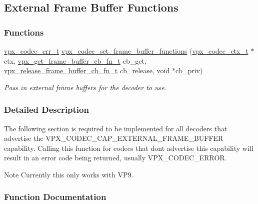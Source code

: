 \hypertarget{group__cap__external__frame__buffer}{}\subsection{External Frame Buffer Functions}
\label{group__cap__external__frame__buffer}
\subsubsection*{Functions}
\begin{DoxyCompactItemize}
\item 
\hyperlink{group__codec_gada1084710837ad363b92f2379dd2b8d2}{vpx\+\_\+codec\+\_\+err\+\_\+t} \hyperlink{group__cap__external__frame__buffer_gad209e7c3f6a330d11846be70a880182c}{vpx\+\_\+codec\+\_\+set\+\_\+frame\+\_\+buffer\+\_\+functions} (\hyperlink{group__codec_gad03e2dfa6ae511db7d25be6bbb336233}{vpx\+\_\+codec\+\_\+ctx\+\_\+t} $\ast$ctx, \hyperlink{vpx__frame__buffer_8h_a178a7aeb9acedc2d9e5227cea1301169}{vpx\+\_\+get\+\_\+frame\+\_\+buffer\+\_\+cb\+\_\+fn\+\_\+t} cb\+\_\+get, \hyperlink{vpx__frame__buffer_8h_a79d9a6a92e4eb753fc2d27f50d996de1}{vpx\+\_\+release\+\_\+frame\+\_\+buffer\+\_\+cb\+\_\+fn\+\_\+t} cb\+\_\+release, void $\ast$cb\+\_\+priv)
\begin{DoxyCompactList}\small\item\em Pass in external frame buffers for the decoder to use. \end{DoxyCompactList}\end{DoxyCompactItemize}


\subsubsection{Detailed Description}
The following section is required to be implemented for all decoders that advertise the V\+P\+X\+\_\+\+C\+O\+D\+E\+C\+\_\+\+C\+A\+P\+\_\+\+E\+X\+T\+E\+R\+N\+A\+L\+\_\+\+F\+R\+A\+M\+E\+\_\+\+B\+U\+F\+F\+ER capability. Calling this function for codecs that don\textquotesingle{}t advertise this capability will result in an error code being returned, usually V\+P\+X\+\_\+\+C\+O\+D\+E\+C\+\_\+\+E\+R\+R\+OR.

\begin{DoxyNote}{Note}
Currently this only works with V\+P9. 
\end{DoxyNote}


\subsubsection{Function Documentation}
